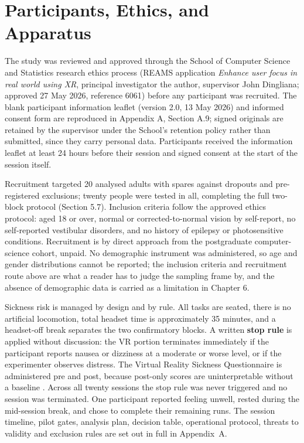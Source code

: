 \section{Participants, Ethics, and Apparatus}

The study was reviewed and approved through the School of Computer Science and Statistics research
ethics process (REAMS application \textit{Enhance user focus in real world using XR}, principal
investigator the author, supervisor John Dingliana; approved 27 May 2026, reference 6061) before any
participant was recruited. The blank
participant information leaflet (version 2.0, 13 May 2026) and informed consent form are reproduced
in Appendix A, Section A.9; signed originals are retained by the supervisor under the School's
retention policy rather than submitted, since they carry personal data. Participants received the
information leaflet at least 24 hours before their session and signed consent at the start of the
session itself.

Recruitment targeted 20 analysed adults with spares against dropouts and pre-registered
exclusions; twenty people were tested in all, completing the full two-block protocol (Section 5.7). Inclusion criteria follow the approved ethics protocol: aged 18 or
over, normal or corrected-to-normal vision by self-report, no self-reported vestibular disorders,
and no history of epilepsy or photosensitive conditions. Recruitment is by direct approach from the
postgraduate computer-science cohort, unpaid. No demographic instrument was administered, so age
and gender distributions cannot be reported; the inclusion criteria and recruitment route
above are what a reader has to judge the sampling frame by, and the absence of demographic data is
carried as a limitation in Chapter 6.

Sickness risk is managed by design and by rule. All tasks are seated, there is no artificial
locomotion, total headset time is approximately 35 minutes, and a headset-off break separates the two
confirmatory blocks. A written \textbf{stop rule} is applied without discussion: the VR portion
terminates immediately if the participant reports nausea or dizziness at a moderate or worse level,
or if the experimenter observes distress. The Virtual Reality Sickness Questionnaire \citep{kim2018}
is administered pre and post, because post-only scores are uninterpretable without a baseline
\citep{brown2022}. Across all twenty sessions the stop rule was never triggered and no
session was terminated. One participant reported feeling unwell, rested during the mid-session
break, and chose to complete their remaining runs. The session timeline, pilot gates, analysis plan, decision table, operational
protocol, threats to validity and exclusion rules are set out in full in Appendix~A.

